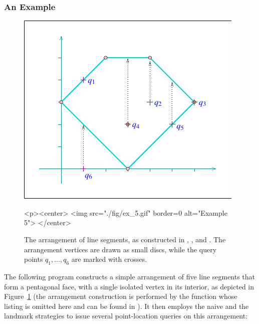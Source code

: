 \subsubsection{An Example\label{arr_sssec:pl_ex}}

\begin{figure}[t]
\begin{ccTexOnly}
  \begin{center}
  \includegraphics{Arrangement_on_surface_2/fig/ex_5}
  \end{center}
\end{ccTexOnly}
\begin{ccHtmlOnly}
  <p><center>
  <img src="./fig/ex_5.gif" border=0 alt="Example 5">
  </center>
\end{ccHtmlOnly}
\caption{The arrangement of line segments, as constructed in
, , and
. The
arrangement vertices are drawn as small discs, while the query
points $q_1, \ldots, q_6$ are marked with crosses.\label{arr_fig:ex_5}}
\end{figure}

The following program constructs a simple arrangement of five line
segments that form a pentagonal face, with a single isolated
vertex in its interior, as depicted in Figure~\ref{arr_fig:ex_5}
(the arrangement construction is performed by the function
 whose listing is omitted here and
can be found in ).
It then employs the naive and the landmark strategies to issue
several point-location queries on this arrangement:

